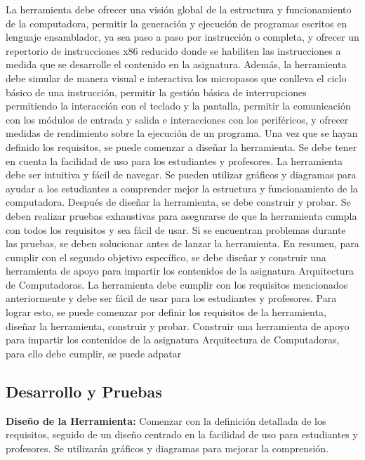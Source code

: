 \documentclass[12pt,twoside]{templates/unerthesis}
\begin{document}
La herramienta debe ofrecer una visión global de la estructura y funcionamiento de la computadora, permitir la generación y ejecución de programas escritos en lenguaje ensamblador, ya sea paso a paso por instrucción o completa, y ofrecer un repertorio de instrucciones x86 reducido donde se habiliten las instrucciones a medida que se desarrolle el contenido en la asignatura. Además, la herramienta debe simular de manera visual e interactiva los micropasos que conlleva el ciclo básico de una instrucción, permitir la gestión básica de interrupciones permitiendo la interacción con el teclado y la pantalla, permitir la comunicación con los módulos de entrada y salida e interacciones con los periféricos, y ofrecer medidas de rendimiento sobre la ejecución de un programa.
Una vez que se hayan definido los requisitos, se puede comenzar a diseñar la herramienta. Se debe tener en cuenta la facilidad de uso para los estudiantes y profesores. La herramienta debe ser intuitiva y fácil de navegar. Se pueden utilizar gráficos y diagramas para ayudar a los estudiantes a comprender mejor la estructura y funcionamiento de la computadora.
Después de diseñar la herramienta, se debe construir y probar. Se deben realizar pruebas exhaustivas para asegurarse de que la herramienta cumpla con todos los requisitos y sea fácil de usar. Si se encuentran problemas durante las pruebas, se deben solucionar antes de lanzar la herramienta.
En resumen, para cumplir con el segundo objetivo específico, se debe diseñar y construir una herramienta de apoyo para impartir los contenidos de la asignatura Arquitectura de Computadoras. La herramienta debe cumplir con los requisitos mencionados anteriormente y debe ser fácil de usar para los estudiantes y profesores. Para lograr esto, se puede comenzar por definir los requisitos de la herramienta, diseñar la herramienta, construir y probar.
Construir una herramienta de apoyo para impartir los contenidos de la asignatura Arquitectura de Computadoras, para ello debe cumplir, se puede adpatar

\hypertarget{desarrollo-y-pruebas}{%
\subsection{Desarrollo y Pruebas}\label{desarrollo-y-pruebas}}

\textbf{Diseño de la Herramienta:} Comenzar con la definición detallada de los requisitos, seguido de un diseño centrado en la facilidad de uso para estudiantes y profesores. Se utilizarán gráficos y diagramas para mejorar la comprensión.
\end{document}
